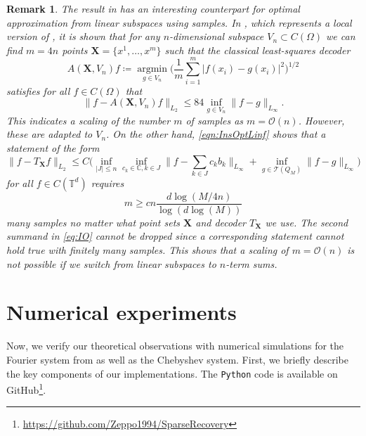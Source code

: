 \documentclass[11pt,reqno, a4paper]{article}
\numberwithin{equation}{section}
\newtheorem{remark}[theorem]{Remark}
\newcommand{\C}{\mathbb{C}}
\DeclareMathOperator*{\argmin}{argmin}
\begin{document}
\begin{remark}\label{rem:IO} The result in  has an interesting counterpart for optimal approximation from linear subspaces using samples. In \cite[Thm.\ 17]{KPUU24}, which represents a local version of \cite{LiTe22}, it is shown that for any $n$-dimensional subspace $V_n \subset C(\Omega)$ we can find $m = 4n$ points $\mathbf{X} = \{x^1,\ldots,x^m\}$ such that the classical least-squares decoder
\begin{equation}\label{eq:lsqrop}
    A(\mathbf{X},V_n)f\coloneqq \argmin\limits_{g\in V_n}\Big(\frac{1}{m}\sum\limits_{i=1}^m |f(x_i)-g(x_i)|^2\Big)^{1/2}
\end{equation}
satisfies for all $f\in C(\Omega)$ that
\begin{equation}
    \|f-A(\mathbf{X},V_n)f\|_{L_2} \leq 84\inf\limits_{g \in V_n}\|f-g\|_{{L_\infty}}.
\end{equation}
This indicates a scaling of the number $m$ of samples as $m=\mathcal O(n)$.
However, these are adapted to $V_n$.
On the other hand, \eqref{eqn:InsOptLinf} shows that a statement of the form
\begin{equation}\label{eq:IO}
    \|f-T_{\mathbf{X}}f\|_{L_2} \leq C\Big(\inf\limits_{|J|\leq n}\inf\limits_{c_k\in \C, k\in J} \Big\|f-\sum\limits_{k\in J} c_kb_k\Big\|_{L_\infty} + \inf\limits_{g \in \mathcal{T}(Q_M)}\|f-g\|_{L_{\infty}}\Big)
\end{equation}
for all $f\in C(\mathbb{T}^d)$ requires
\begin{equation}
    m\geq cn\frac{d\log(M/4n)}{\log(d\log(M))}
\end{equation}
many samples no matter what point sets $\mathbf{X}$ and decoder $T_{\mathbf{X}}$ we use.
The second summand in \eqref{eq:IO} cannot be dropped since a corresponding statement cannot hold true with finitely many samples.
This shows that a scaling of $m=\mathcal O(n)$ is not possible if we switch from linear subspaces to $n$-term sums.  
\end{remark}
\section{Numerical experiments}\label{sec:Numerics}

Now, we verify our theoretical observations with numerical simulations for the Fourier system from  as well as the Chebyshev system.
First, we briefly describe the key components of our implementations.
The \texttt{Python} code is available on GitHub\footnote{\href{https://github.com/Zeppo1994/SparseRecovery}{https://github.com/Zeppo1994/SparseRecovery}}.
\end{document}
